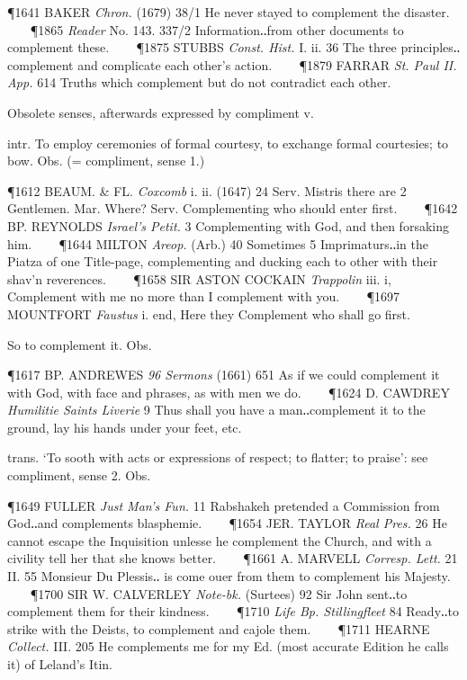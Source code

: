 \begin{description}[wide, labelwidth=!, labelindent=0pt]
\begin{myenumerate}
\P 1641 BAKER  \textit{Chron.} (1679) 38/1 He never stayed to complement the disaster.    
\P 1865  \textit{Reader} No. 143. 337/2 Information‥from other documents to complement these.    
\P 1875 STUBBS  \textit{Const. Hist.} I. ii. 36 The three principles‥complement and complicate each other's action.    
\P 1879 FARRAR  \textit{St. Paul II. App.} 614 Truths which complement but do not contradict each other.

 Obsolete senses, afterwards expressed by compliment v.

 intr. To employ ceremonies of formal courtesy, to exchange formal courtesies; to bow. Obs. (= compliment, sense 1.)

\P 1612 BEAUM. \& FL.  \textit{Coxcomb} i. ii. (1647) 24 Serv. Mistris there are 2 Gentlemen. Mar. Where? Serv. Complementing who should enter first.    
\P 1642 BP. REYNOLDS  \textit{Israel's Petit.} 3 Complementing with God, and then forsaking him.    
\P 1644 MILTON  \textit{Areop.} (Arb.) 40 Sometimes 5 Imprimaturs‥in the Piatza of one Title-page, complementing and ducking each to other with their shav'n reverences.    
\P 1658 SIR ASTON  COCKAIN \textit{Trappolin} iii. i, Complement with me no more than I complement with you.    
\P 1697 MOUNTFORT  \textit{Faustus} i. end, Here they Complement who shall go first.

 So to complement it. Obs.

\P 1617 BP. ANDREWES  \textit{96 Sermons} (1661) 651 As if we could complement it with God, with face and phrases, as with men we do.    
\P 1624 D. CAWDREY  \textit{Humilitie Saints Liverie} 9 Thus shall you have a man‥complement it to the ground, lay his hands under your feet, etc.

 trans. ‘To sooth with acts or expressions of respect; to flatter; to praise’: see compliment, sense 2. Obs.

\P 1649 FULLER  \textit{Just Man's Fun.} 11 Rabshakeh pretended a Commission from God‥and complements blasphemie.    
\P 1654 JER. TAYLOR  \textit{Real Pres.} 26 He cannot escape the Inquisition unlesse he complement the Church, and with a civility tell her that she knows better.    
\P 1661 A. MARVELL  \textit{Corresp. Lett.} 21 II. 55 Monsieur Du Plessis‥ is come ouer from them to complement his Majesty.    
\P 1700 SIR W. CALVERLEY  \textit{Note-bk.} (Surtees) 92 Sir John sent‥to complement them for their kindness.    
\P 1710  \textit{Life Bp. Stillingfleet} 84 Ready‥to strike with the Deists, to complement and cajole them.    
\P 1711 HEARNE  \textit{Collect.} III. 205 He complements me for my Ed. (most accurate Edition he calls it) of Leland's Itin.


\end{myenumerate}
\end{description}
